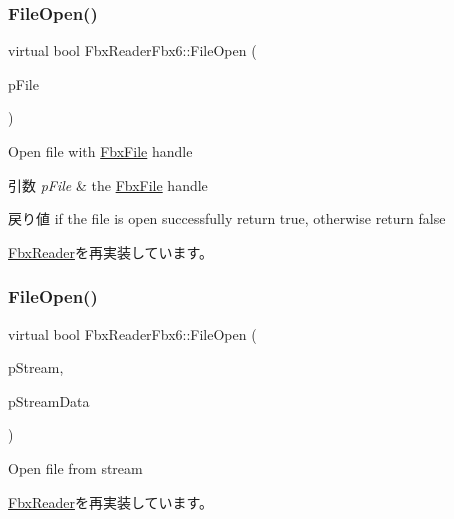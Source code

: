 \subsubsection{\texorpdfstring{File\+Open()}{FileOpen()}\hspace{0.1cm}{\footnotesize\ttfamily [3/4]}}
{\footnotesize\ttfamily virtual bool Fbx\+Reader\+Fbx6\+::\+File\+Open (\begin{DoxyParamCaption}\item[{\hyperlink{class_fbx_file}{Fbx\+File} $\ast$}]{p\+File }\end{DoxyParamCaption})\hspace{0.3cm}{\ttfamily [virtual]}}

Open file with \hyperlink{class_fbx_file}{Fbx\+File} handle 
\begin{DoxyParams}{引数}
{\em p\+File} & the \hyperlink{class_fbx_file}{Fbx\+File} handle \\
\hline
\end{DoxyParams}
\begin{DoxyReturn}{戻り値}
if the file is open successfully return {\ttfamily true}, otherwise return {\ttfamily false} 
\end{DoxyReturn}


\hyperlink{class_fbx_reader_a9e334ad0c2abd069c35a016413a8adcd}{Fbx\+Reader}を再実装しています。

\mbox{\label{class_fbx_reader_fbx6_a841f736cd6203c124aba426b66559968}} 
\subsubsection{\texorpdfstring{File\+Open()}{FileOpen()}\hspace{0.1cm}{\footnotesize\ttfamily [4/4]}}
{\footnotesize\ttfamily virtual bool Fbx\+Reader\+Fbx6\+::\+File\+Open (\begin{DoxyParamCaption}\item[{\hyperlink{class_fbx_stream}{Fbx\+Stream} $\ast$}]{p\+Stream,  }\item[{void $\ast$}]{p\+Stream\+Data }\end{DoxyParamCaption})\hspace{0.3cm}{\ttfamily [virtual]}}

Open file from stream 

\hyperlink{class_fbx_reader_a819487a39b5e25f69a8dccf187ab4ab9}{Fbx\+Reader}を再実装しています。


